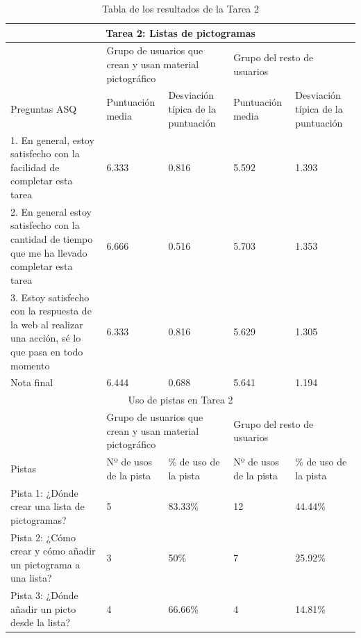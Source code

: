 \begin{table}
\begin{tabular}{ |p{4cm}|p{2cm}|p{2cm}|p{2cm}|p{2cm}|  }
	\hline
	\multicolumn{5}{|c|}{Tarea 2: Listas de pictogramas} \\
	\hline
	& \multicolumn{2}{p{4cm}|}{Grupo de usuarios que crean y usan material pictográfico} & \multicolumn{2}{p{4cm}|}{Grupo del resto de usuarios }  \\ 
	\hline
	Preguntas ASQ & Puntuación media  &Desviación típica de la puntuación & Puntuación media & Desviación típica de la puntuación\\
	\hline
	1. En general, estoy satisfecho con la facilidad de completar esta tarea &6.333  &0.816 &5.592 &1.393\\
	\hline
	2. En general estoy satisfecho con la cantidad de tiempo que me ha llevado completar esta tarea &6.666  &0.516 &5.703 &1.353\\
	\hline
	3. Estoy satisfecho con la respuesta de la web al realizar una acción, sé lo que pasa en todo momento &6.333 &0.816 &5.629   &1.305\\
	\hline
	Nota final &6.444 &0.688 &5.641  &1.194\\
	\hline
	\multicolumn{5}{|c|}{Uso de pistas en Tarea 2} \\
	\hline
	& \multicolumn{2}{p{4cm}|}{Grupo de usuarios que crean y usan material pictográfico} & \multicolumn{2}{p{4cm}|}{Grupo del resto de usuarios }  \\ 
	\hline
	Pistas &Nº de usos de la pista &\% de uso de la pista&Nº de usos de la pista&\% de uso de la pista\\
	\hline
	Pista 1: ¿Dónde crear una lista de pictogramas? &5  &83.33\% &12 &44.44\%\\
	\hline
	Pista 2: ¿Cómo crear y cómo añadir un pictograma a una lista? &3  &50\%  &7 &25.92\%\\
	\hline
	Pista 3: ¿Dónde añadir un picto desde la lista? &4 &66.66\% &4  &14.81\%\\
	\hline
\end{tabular}
\caption{\label{tab:area2respuestas}Tabla de los resultados de la Tarea 2}
\end{table}


